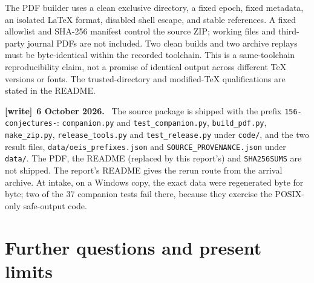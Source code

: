 \documentclass[11pt,letterpaper]{article}
\numberwithin{equation}{section}
\theoremstyle{remark}\newtheorem{remark}[theorem]{Remark}
\newcommand{\file}[1]{\nolinkurl{#1}}
\newenvironment{writenote}[1][]{\par\smallskip\begingroup\small
 \noindent\textbf{[write]}\if\relax\detokenize{#1}\relax\else~\textbf{#1.}\fi\ }%
 {\par\endgroup\smallskip}
\begin{document}
The PDF builder uses a clean exclusive directory, a fixed epoch,
fixed metadata, an isolated LaTeX format, disabled shell escape,
and stable references. A fixed allowlist and SHA-256 manifest
control the source ZIP; working files and third-party
journal PDFs are not included. Two clean builds and two archive
replays must be byte-identical within the recorded toolchain.
This is a same-toolchain reproducibility claim, not a promise of
identical output across different TeX versions or fonts. The
trusted-directory and modified-TeX qualifications are stated in
the README.
\begin{writenote}[6 October 2026]
The source package is shipped with the prefix \file{156-conjectures-}: \file{companion.py} and \file{test_companion.py}, \file{build_pdf.py}, \file{make_zip.py}, \file{release_tools.py} and \file{test_release.py} under \file{code/}, and the two result files, \file{data/oeis_prefixes.json} and \file{SOURCE_PROVENANCE.json} under \file{data/}. The PDF, the README (replaced by this report's) and \file{SHA256SUMS} are not shipped. The report's README gives the rerun route from the arrival archive. At intake, on a Windows copy, the exact data were regenerated byte for byte; two of the 37 companion tests fail there, because they exercise the POSIX-only safe-output code.
\end{writenote}

\section{Further questions and present limits}\label{dgp:conj:sec:questions}
\end{document}
